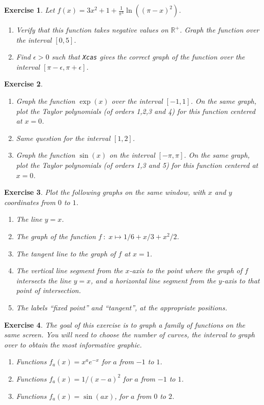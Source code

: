 \documentclass{article}
\newtheorem{exo}{Exercise}[section]
\begin{document}
\begin{exo}{\rm
Let
$f(x)=3x^2+1+\frac{1}{\pi^4}\ln((\pi-x)^2)$.
\begin{enumerate}
\item
Verify that this function takes negative values on $\mathbb{R}^+$.
Graph the function over the interval $[0,5]$.
\item
Find $\epsilon >0$ such that {\tt Xcas} gives the correct graph of the
function over the interval $[\pi-\epsilon,\pi+\epsilon]$. 
\end{enumerate}
}\end{exo}
\begin{exo}{\rm~
\begin{enumerate}
\item
Graph the function $\exp(x)$ over the interval $[-1,1]$. 
On the same graph, plot the Taylor polynomials (of orders 1,2,3 and 4)
for this function centered at $x=0$.
\item
Same question for the interval $[1,2]$. 
\item
Graph the function $\sin(x)$ on the interval $[-\pi,\pi]$.
On the same graph, plot the Taylor polynomials (of orders 1,3 and 5)
for this function centered at $x=0$.
\end{enumerate}
}\end{exo}
\begin{exo}{\rm
Plot the following graphs on the same window, with $x$ and $y$
coordinates from $0$ to $1$.
\begin{enumerate}
\item
The line $y=x$.
\item
The graph of the function $f~: \;x\mapsto 1/6+x/3+x^2/2$.
\item
The tangent line to the graph of $f$ at $x=1$.
\item
The vertical line segment from the $x$-axis to the point where the
graph of $f$ intersects the line $y=x$, and a horizontal line segment
from the $y$-axis to that point of intersection.
\item
The labels ``fixed point'' and ``tangent'', at the appropriate positions.
\end{enumerate} 
}\end{exo}
\begin{exo}{\rm
The goal of this exercise is to graph a family of functions on the
same screen.  You will need to choose the number of curves, the
interval to graph over to obtain the most informative graphic.
\begin{enumerate}
\item 
Functions $f_a(x) = x^ae^{-x}$ for $a$ from $-1$ to $1$. 
\item
Functions $f_a(x)=1/(x-a)^2$ for $a$ from $-1$ to $1$.
\item
Functions $f_a(x)=\sin(ax)$, for $a$ from $0$ to $2$.
\end{enumerate} 
}\end{exo}
\end{document}
